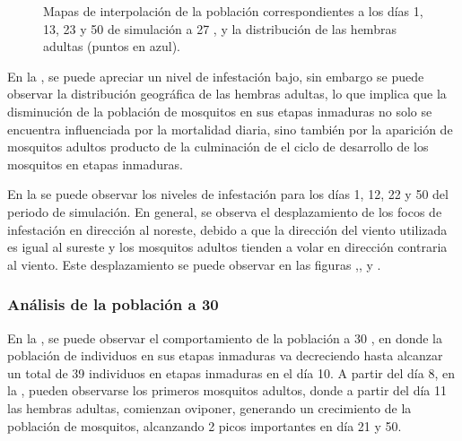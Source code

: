 \begin{figure}[!htbp]
    \caption{\label{fig:niveles-infestacion-27} Mapas de interpolación de la población correspondientes a los días 1, 13, 23 y 50 de simulación a 27 \textcelsius, y la distribución de las hembras adultas (puntos en azul). }
\end{figure}

En la , se puede apreciar un nivel de infestación bajo, sin
embargo se puede observar la distribución geográfica de las hembras adultas, lo que implica que la
disminución de la población de mosquitos en sus etapas inmaduras no solo se encuentra influenciada
por la mortalidad diaria, sino también por la aparición de mosquitos adultos producto de la culminación de el ciclo de desarrollo de los mosquitos en etapas inmaduras.

En la  se puede observar los niveles de infestación
para los días 1, 12, 22 y 50 del periodo de simulación. En general, se observa el
desplazamiento de los focos de infestación en dirección al noreste, debido a que la dirección del
viento utilizada es igual al sureste y los mosquitos adultos tienden a volar en dirección
contraria al viento. Este desplazamiento se puede observar en las figuras
,,
 y .

\subsubsection{Análisis de la población a 30\textcelsius}
En la , se puede observar el comportamiento de la población a
30 \textcelsius, en donde la población de individuos en sus etapas inmaduras va decreciendo hasta
alcanzar un total de 39 individuos en etapas inmaduras en el día 10. A partir del día 8, en la
, pueden observarse los primeros mosquitos adultos, donde a
partir del día 11 las hembras adultas, comienzan oviponer, generando un crecimiento de la
población de mosquitos, alcanzando 2 picos importantes en día 21 y 50.

